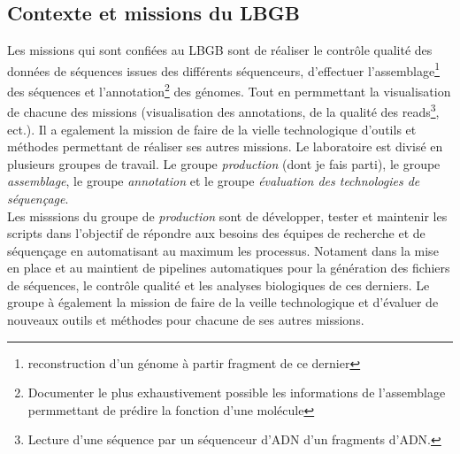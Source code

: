 \subsection{Contexte et missions du LBGB}
Les missions qui sont confiées au LBGB sont de réaliser le contrôle qualité des données de séquences issues des différents séquenceurs, d'effectuer l'assemblage\footnote{reconstruction d'un génome à partir fragment de ce dernier} des séquences et l'annotation\footnote{Documenter le plus exhaustivement possible les informations de l'assemblage permmettant de prédire la fonction d'une molécule} des génomes. Tout en permmettant la visualisation de chacune des missions (visualisation des annotations, de la qualité des reads\footnote{Lecture d'une séquence par un séquenceur d'ADN d'un fragments d'ADN.}, ect.). Il a egalement la mission de faire de la vielle technologique d'outils et méthodes permettant de réaliser ses autres missions. 
Le laboratoire est divisé en plusieurs groupes de travail. Le groupe \emph{production} (dont je fais parti), le groupe \emph{assemblage}, le groupe \emph{annotation} et le groupe \emph{évaluation des technologies de séquençage}.\\

Les misssions du groupe de \emph{production} sont de développer, tester et maintenir les scripts dans l'objectif de répondre aux besoins des équipes de recherche et de séquençage en automatisant au maximum les processus. Notament dans la mise en place et au maintient de pipelines automatiques pour la génération des fichiers de séquences, le contrôle qualité et les analyses biologiques de ces derniers. Le groupe à également la mission de faire de la veille technologique et d'évaluer de nouveaux outils et méthodes pour chacune de ses autres missions.


